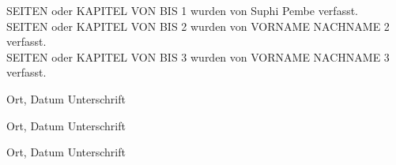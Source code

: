 \documentclass[12pt,toc=bib,toc=listof]{scrreprt}
\newcommand{\studentnameA}{Suphi Pembe}
\newcommand{\studentpartA}{SEITEN oder KAPITEL VON BIS 1}
\newcommand{\studentnameB}{VORNAME NACHNAME 2}
\newcommand{\studentpartB}{SEITEN oder KAPITEL VON BIS 2}
\newcommand{\studentnameC}{VORNAME NACHNAME 3}
\newcommand{\studentpartC}{SEITEN oder KAPITEL VON BIS 3}
\begin{document}
\vspace{1cm}
\noindent
{\studentpartA} wurden von {\studentnameA} verfasst.
\\
{\studentpartB} wurden von {\studentnameB} verfasst.
\\
{\studentpartC} wurden von {\studentnameC} verfasst.

\vspace{3cm}
Ort, Datum \hfill Unterschrift

\vspace{2cm}
Ort, Datum \hfill Unterschrift

\vspace{2cm}
Ort, Datum \hfill Unterschrift
\end{document}
